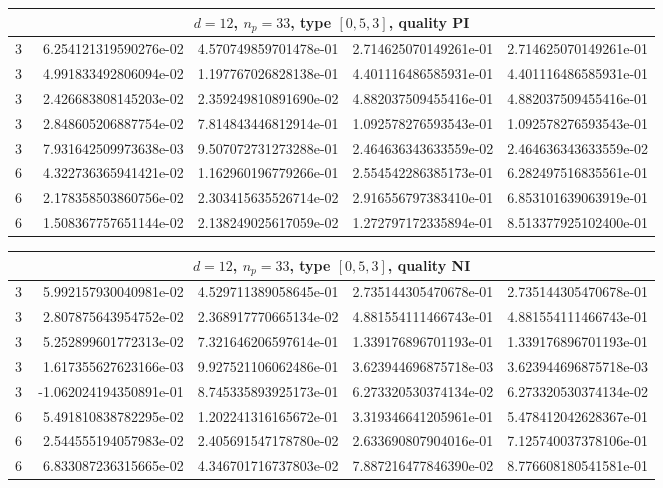 \documentclass{article}
\begin{document}
\begin{center}
\begin{tabular}{rrrrr}
\multicolumn{5}{c}{\rmfamily $d=12$, $n_p=33$, type $[0,5,3]$, quality PI}\\
\toprule
3 & ~6.254121319590276e-02 & 4.570749859701478e-01 & 2.714625070149261e-01 & 2.714625070149261e-01\\
3 & ~4.991833492806094e-02 & 1.197767026828138e-01 & 4.401116486585931e-01 & 4.401116486585931e-01\\
3 & ~2.426683808145203e-02 & 2.359249810891690e-02 & 4.882037509455416e-01 & 4.882037509455416e-01\\
3 & ~2.848605206887754e-02 & 7.814843446812914e-01 & 1.092578276593543e-01 & 1.092578276593543e-01\\
3 & ~7.931642509973638e-03 & 9.507072731273288e-01 & 2.464636343633559e-02 & 2.464636343633559e-02\\
6 & ~4.322736365941421e-02 & 1.162960196779266e-01 & 2.554542286385173e-01 & 6.282497516835561e-01\\
6 & ~2.178358503860756e-02 & 2.303415635526714e-02 & 2.916556797383410e-01 & 6.853101639063919e-01\\
6 & ~1.508367757651144e-02 & 2.138249025617059e-02 & 1.272797172335894e-01 & 8.513377925102400e-01\\
\bottomrule
\end{tabular}
\bigskip

\begin{tabular}{rrrrr}
\multicolumn{5}{c}{\rmfamily $d=12$, $n_p=33$, type $[0,5,3]$, quality NI}\\
\toprule
3 & ~5.992157930040981e-02 & 4.529711389058645e-01 & 2.735144305470678e-01 & 2.735144305470678e-01\\
3 & ~2.807875643954752e-02 & 2.368917770665134e-02 & 4.881554111466743e-01 & 4.881554111466743e-01\\
3 & ~5.252899601772313e-02 & 7.321646206597614e-01 & 1.339176896701193e-01 & 1.339176896701193e-01\\
3 & ~1.617355627623166e-03 & 9.927521106062486e-01 & 3.623944696875718e-03 & 3.623944696875718e-03\\
3 & -1.062024194350891e-01 & 8.745335893925173e-01 & 6.273320530374134e-02 & 6.273320530374134e-02\\
6 & ~5.491810838782295e-02 & 1.202241316165672e-01 & 3.319346641205961e-01 & 5.478412042628367e-01\\
6 & ~2.544555194057983e-02 & 2.405691547178780e-02 & 2.633690807904016e-01 & 7.125740037378106e-01\\
6 & ~6.833087236315665e-02 & 4.346701716737803e-02 & 7.887216477846390e-02 & 8.776608180541581e-01\\
\bottomrule
\end{tabular}
\bigskip


\end{center}
\end{document}
